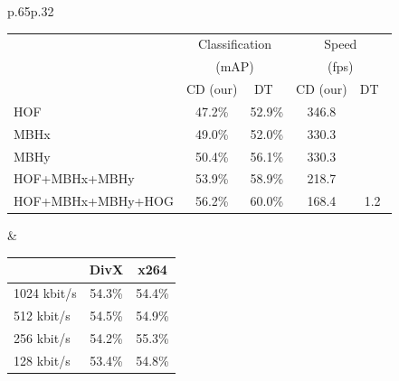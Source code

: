 \documentclass[10pt,twocolumn,letterpaper]{article}
\begin{document}
\begin{table}[t!]
\begin{center}
\begin{tabular}{p{}p{}}
\hspace*{.4cm}
\begin{tabular}{|l||c|c||c|c|}
\hline
\multirow{3}{*}{} &\multicolumn{2}{c||}{Classification} & \multicolumn{2}{c|}{Speed}\\
                  &\multicolumn{2}{c||}{(mAP)} & \multicolumn{2}{c|}{(fps)}\\
\cline{2-5}
& CD (our) & DT~\cite{Wang12} & CD (our) & DT~\cite{Wang12}\\
\hline\hline
HOF               & 47.2\% & 52.9\% & 346.8 &  \\\hline
MBHx              & 49.0\% & 52.0\% & 330.3 &  \\\hline
MBHy              & 50.4\% & 56.1\% & 330.3 &  \\\hline
HOF+MBHx+MBHy     & 53.9\% & 58.9\% & 218.7 &  \\\hline
HOF+MBHx+MBHy+HOG & 56.2\% & 60.0\% & 168.4 & 1.2 \\\hline
\end{tabular}
&
\mbox{}\vspace{-.55cm}\newline
\hspace*{.2cm}
\begin{tabular}{|l|c|c|}
\hline
             & DivX  & x264  \\\hline
1024 kbit/s  & 54.3\% & 54.4\% \\\hline
512 kbit/s   & 54.5\% & 54.9\% \\\hline
256 kbit/s   & 54.2\% & 55.3\% \\\hline
128 kbit/s   & 53.4\% & 54.8\% \\\hline
\end{tabular}
%

\end{tabular}
\end{center}
\end{table}
\end{document}
